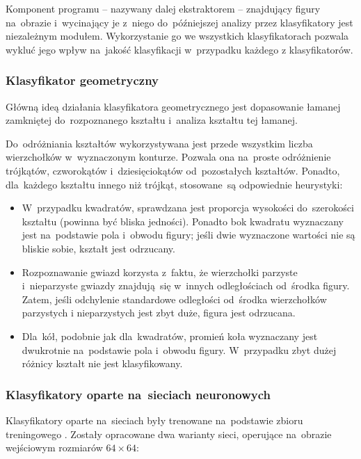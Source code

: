 \documentclass[11pt,a4paper]{article}
\begin{document}
\newpage
Komponent programu -- nazywany dalej ekstraktorem -- znajdujący figury na~obrazie i~wycinający je z~niego do~późniejszej analizy przez klasyfikatory jest niezależnym modułem. Wykorzystanie go we wszystkich klasyfikatorach pozwala wykluć jego wpływ na~jakość klasyfikacji w~przypadku każdego z klasyfikatorów.

\subsubsection{Klasyfikator geometryczny}

Główną ideą działania klasyfikatora geometrycznego jest dopasowanie łamanej zamkniętej do~rozpoznanego kształtu i~analiza kształtu tej łamanej.

Do~odróżniania kształtów wykorzystywana jest przede wszystkim liczba wierzchołków w~wyznaczonym konturze.
Pozwala ona na~proste odróżnienie trójkątów, czworokątów i~dziesięciokątów od~pozostałych kształtów.
Ponadto, dla~każdego kształtu innego niż trójkąt, stosowane~są odpowiednie heurystyki:

\begin{itemize}
    \item W~przypadku kwadratów, sprawdzana jest proporcja wysokości do~szerokości kształtu (powinna być bliska jedności).
    Ponadto bok kwadratu wyznaczany jest na~podstawie pola i~obwodu figury; jeśli dwie wyznaczone wartości nie są bliskie sobie, kształt jest odrzucany.
    \item Rozpoznawanie gwiazd korzysta z~faktu, że wierzchołki parzyste i~nieparzyste gwiazdy znajdują~się w~innych odległościach od~środka figury.
    Zatem, jeśli odchylenie standardowe odległości od~środka wierzchołków parzystych i nieparzystych jest zbyt duże, figura jest odrzucana.
    \item Dla~kół, podobnie jak dla~kwadratów, promień koła wyznaczany jest dwukrotnie na~podstawie pola i~obwodu figury.
    W~przypadku zbyt dużej różnicy kształt nie jest klasyfikowany.
\end{itemize}

\subsubsection{Klasyfikatory oparte na~sieciach neuronowych}

Klasyfikatory oparte na~sieciach były trenowane na~podstawie zbioru treningowego \cite{shapes}.
Zostały opracowane dwa warianty sieci, operujące na~obrazie wejściowym rozmiarów $64 \times 64$:
\end{document}
